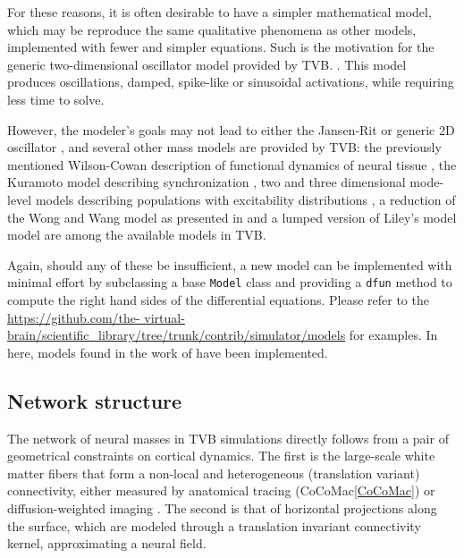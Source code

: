 	For these reasons, it is often desirable to have a simpler mathematical 
	model, which may be reproduce the same qualitative phenomena as other 
	models, implemented with fewer and simpler equations. Such is the motivation
	for the generic two-dimensional oscillator model provided by TVB. 
	. This model produces oscillations, damped, spike-like or 
	sinusoidal activations, while requiring less time to solve.

	However, the modeler's goals may not lead to either the Jansen-Rit
	\cite{Jansen_1995, David_2003, David_2004} or generic 2D oscillator
	\cite{FitzHugh_1961, Nagumo_1962}, and several other mass models are
	provided by TVB: the previously mentioned Wilson-Cowan description of
	functional dynamics of neural tissue \cite{Wilson_1972}, the Kuramoto
	model describing synchronization \cite{Kuramoto_1975, Cabral_2011}, two
	and three dimensional mode-level models describing populations with
	excitability distributions \cite{Stefanescu_2011, Stefanescu_2008}, a
	reduction of the Wong and Wang model \cite{Wong_2006} as presented in
	\cite{Deco_2013} and a lumped version of Liley's model \cite{Liley_1999,
	Steyn-Ross_1999} model are among the available models in TVB.

	Again, should any of these be insufficient, a new model can be implemented
	with minimal effort by subclassing a base \texttt{Model} class and
	providing a  \texttt{dfun} method to compute the right hand sides of the
	differential  equations. Please refer to the \url{https://github.com/the-
	virtual-brain/scientific_library/tree/trunk/contrib/simulator/models} for
	examples. In here, models found in the work of \cite{Larter_1999,
	Breakspear_2003, Morris_1981, Hindmarsh_1984, Brunel_2001} have been implemented.

	

\subsection{Network structure}

	The network of neural masses in TVB simulations directly follows from  a
	pair of geometrical constraints on cortical dynamics. The first is the
	large-scale white matter fibers that form a non-local and heterogeneous
	(translation variant) connectivity, either measured by anatomical tracing
	(CoCoMac\ref{CoCoMac}) or diffusion-weighted imaging \cite{Hagmann_2008,
	Honey_2009, Bastiani_2012}. The second is that of horizontal projections
	along the surface, which are modeled through a translation invariant
	 connectivity kernel,
	approximating a neural field.

